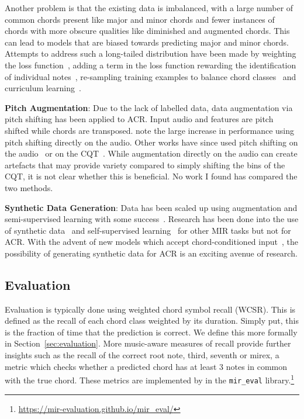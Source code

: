 Another problem is that the existing data is imbalanced, with a large number of common chords present like major and minor chords and fewer instances of chords with more obscure qualities like diminished and augmented chords. This can lead to models that are biased towards predicting major and minor chords. Attempts to address such a long-tailed distribution have been made by weighting the loss function~\citep{ACRLargeVocab1}, adding a term in the loss function rewarding the identification of individual notes~\citep{StructuredTraining,ACRLargeVocab1}, re-sampling training examples to balance chord classes~\citep{BalanceRandomForestACR} and curriculum learning~\citep{CurriculumLearning}.

\textbf{Pitch Augmentation}: Due to the lack of labelled data, data augmentation via pitch shifting has been applied to ACR. Input audio and features are pitch shifted while chords are transposed. \citet{StructuredTraining} note the large increase in performance using pitch shifting directly on the audio. Other works have since used pitch shifting on the audio~\citep{BTC} or on the CQT~\citep{ACRLargeVocab1}. While augmentation directly on the audio can create artefacts that may provide variety compared to simply shifting the bins of the CQT, it is not clear whether this is beneficial. No work I found has compared the two methods.

\textbf{Synthetic Data Generation}: Data has been scaled up using augmentation and semi-supervised learning with some success~\citep{ScalingUpSemiSupervisedLearning}. Research has been done into the use of synthetic data~\citep{MusicGenTrainingData,AnnotationFreeSyntheticData} and self-supervised learning~\citep{MERTSupervisedLearning} for other MIR tasks but not for ACR. With the advent of new models which accept chord-conditioned input~\citep{MusicGenChord,MusiConGen,CocoMulla}, the possibility of generating synthetic data for ACR is an exciting avenue of research.

\subsection{Evaluation}

Evaluation is typically done using weighted chord symbol recall (WCSR). This is defined as the recall of each chord class weighted by its duration. Simply put, this is the fraction of time that the prediction is correct. We define this more formally in Section~\ref{sec:evaluation}. More music-aware measures of recall provide further insights such as the recall of the correct root note, third, seventh or mirex, a metric which checks whether a predicted chord has at least 3 notes in common with the true chord. These metrics are implemented by \citet{mir_eval} in the \texttt{mir\_eval} library.\footnote{\url{https://mir-evaluation.github.io/mir_eval/}} 

